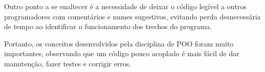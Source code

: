 \documentclass[runningheads,a4paper]{llncs}
\begin{document}
	Outro ponto a se enaltecer é a necessidade de deixar o código legível a outros programadores com comentários e numes sugestivos, evitando perda desnecessária de tempo ao identificar o funcionamento dos trechos do programa.

	Portanto, os conceitos desenvolvidos pela disciplina de POO foram muito importantes, observando que um código pouco acoplado é mais fácil de dar manutenção, fazer testes e corrigir erros.


\nocite{*} 
\end{document}
